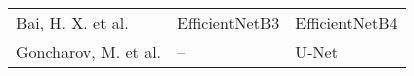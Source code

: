 \begin{table}[ht]
\begin{tabularx}{1.0\textwidth} { 
  >{\hsize=6.5cm\raggedleft\arraybackslash}X 
  >{\raggedright\arraybackslash}X 
  >{\raggedright\arraybackslash}X
 }
\\

Bai, H. X. et al. \cite{bai2020artificial} & 
EfficientNetB3 & 
EfficientNetB4


\\

Goncharov, M. et al. \cite{goncharov2021ct} & 
– & 
U-Net


\\

\bottomrule

\end{tabularx}
\end{table}






